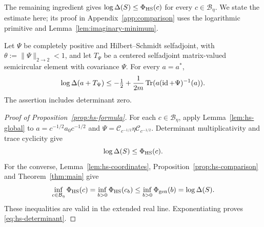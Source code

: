 The remaining ingredient gives $\log\Delta(S)\le\Phi_{\rm HS}(c)$ for every $c\in\mathcal B_\eta$.
We state the estimate here; its proof in Appendix~\ref{app:comparison} uses the logarithmic primitive and Lemma~\ref{lem:imaginary-minimum}.

\begin{lemma}\label{lem:hs-global}
Let $\Psi$ be completely positive and Hilbert--Schmidt selfadjoint, with $\theta:=\|\Psi\|_{2\to2}<1$, and let $T_\Psi$ be a centered selfadjoint matrix-valued semicircular element with covariance $\Psi$.
For every $a=a^*$,
\begin{equation}\label{eq:hs-global-comparison}
 \log\Delta(a+T_\Psi)
 \le-\tfrac12+\frac1{2m}\operatorname{Tr}(a(\operatorname{id}+\Psi)^{-1}(a)).
\end{equation}
The assertion includes determinant zero.
\end{lemma}

\begin{proof}[Proof of Proposition~\ref{prop:hs-formula}]
For each $c\in\mathcal B_\eta$, apply Lemma~\ref{lem:hs-global} to $a=c^{-1/2}a_0c^{-1/2}$ and $\Psi=\mathcal C_{c^{-1/2}}\eta\mathcal C_{c^{-1/2}}$.
Determinant multiplicativity and trace cyclicity give
\[
 \log\Delta(S)\le\Phi_{\rm HS}(c).
\]
For the converse, Lemma~\ref{lem:hs-coordinates}, Proposition~\ref{prop:hs-comparison} and Theorem~\ref{thm:main} give
\begin{equation}\label{eq:hs-infimum-chain}
 \inf_{c\in\mathcal B_\eta}\Phi_{\rm HS}(c)
 =\inf_{b>0}\Phi_{\rm HS}(c_b)
 \le\inf_{b>0}\Phi_{\rm gen}(b)=\log\Delta(S).
\end{equation}
These inequalities are valid in the extended real line.
Exponentiating proves \eqref{eq:hs-determinant}.
\end{proof}

